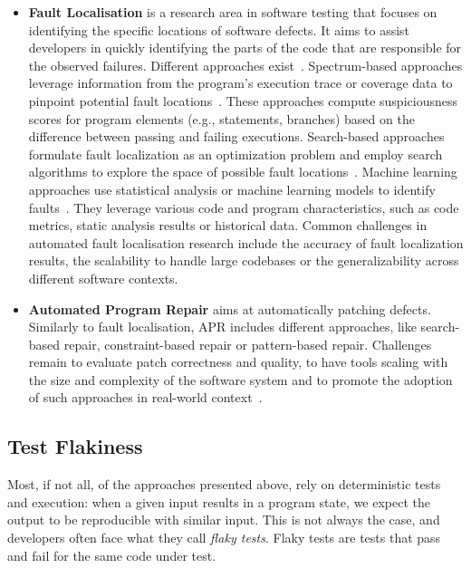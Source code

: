 \begin{itemize}[label={}]
    \item \textbf{Fault Localisation} is a research area in software testing that focuses on identifying the specific locations of software defects. It aims to assist developers in quickly identifying the parts of the code that are responsible for the observed failures.
    Different approaches exist~\cite{papadakis2015metallaxis}. Spectrum-based approaches leverage information from the program's execution trace or coverage data to pinpoint potential fault locations~\cite{wen2019historical,de2016spectrum}. These approaches compute suspiciousness scores for program elements (e.g., statements, branches) based on the difference between passing and failing executions. Search-based approaches formulate fault localization as an optimization problem and employ search algorithms to explore the space of possible fault locations~\cite{leitao2020search,}. Machine learning approaches use statistical analysis or machine learning models to identify faults~\cite{li2019deepfl}. They leverage various code and program characteristics, such as code metrics, static analysis results or historical data. Common challenges in automated fault localisation research include the accuracy of fault localization results, the scalability to handle large codebases or the generalizability across different software contexts.
        
    \item \textbf{Automated Program Repair} aims at automatically patching defects. Similarly to fault localisation, APR includes different approaches, like search-based repair, constraint-based repair or pattern-based repair. Challenges remain to evaluate patch correctness and quality, to have tools scaling with the size and complexity of the software system and to promote the adoption of such approaches in real-world context~\cite{goues2019automated,qi2014strength,motwani2018automated}.

\end{itemize}

\subsection{Test Flakiness}

Most, if not all, of the approaches presented above, rely on deterministic tests and execution: when a given input results in a program state, we expect the output to be reproducible with similar input. This is not always the case, and developers often face what they call \textit{flaky tests}. 
Flaky tests are tests that pass and fail for the same code under test. 

